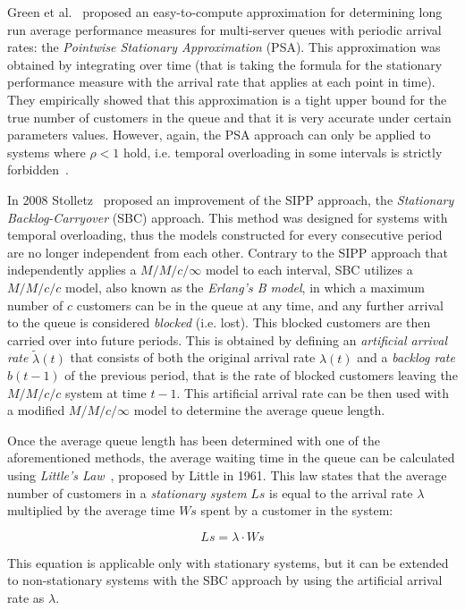 Green et al.~\cite{green1991} proposed an easy-to-compute approximation for determining long run average performance measures for multi-server queues with periodic arrival rates: the \emph{Pointwise Stationary Approximation} (PSA). This approximation was obtained by integrating over time (that is taking the formula for the stationary performance measure with the arrival rate that applies at each point in time). They empirically showed that this approximation is a tight upper bound for the true number of customers in the queue and that it is very accurate under certain parameters values. However, again, the PSA approach can only be applied to systems where \( \rho < 1 \) hold, i.e. temporal overloading in some intervals is strictly forbidden~\cite{stolletz}.

In 2008 Stolletz~\cite{stolletz} proposed an improvement of the SIPP approach, the \emph{Stationary Backlog-Carryover} (SBC) approach. This method was designed for systems with temporal overloading, thus the models constructed for every consecutive period are no longer independent from each other. Contrary to the SIPP approach that independently applies a \( M/M/c/\infty \) model to each interval, SBC utilizes a \( M/M/c/c \) model, also known as the \emph{Erlang’s B model}, in which a maximum number of \( c \) customers can be in the queue at any time, and any further arrival to the queue is considered \emph{blocked} (i.e. lost). This blocked customers are then carried over into future periods. This is obtained by defining an \emph{artificial arrival rate} \( \widetilde{\lambda}(t) \) that consists of both the original arrival rate \( \lambda(t) \) and a \emph{backlog rate} \( b(t-1) \) of the previous period, that is the rate of blocked customers leaving the \( M/M/c/c \) system at time \( t-1 \). This artificial arrival rate can be then used with a modified \( M/M/c/\infty \) model to determine the average queue length.

Once the average queue length has been determined with one of the aforementioned methods, the average waiting time in the queue can be calculated using \emph{Little’s Law}~\cite{little}, proposed by Little in 1961. This law states that the average number of customers in a \emph{stationary system} \( Ls \) is equal to the arrival rate \( \lambda \) multiplied by the average time \( Ws \) spent by a customer in the system:

\begin{equation}
  Ls = \lambda \cdot Ws
  \label{eq:little_law}
\end{equation}

This equation is applicable only with stationary systems, but it can be extended to non-stationary systems with the SBC approach by using the artificial arrival rate as \( \lambda \).

\clearpage